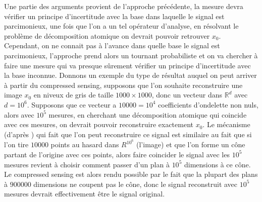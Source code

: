 Une partie des arguments provient de l'approche précédente, la mesure devra vérifier un principe d'incertitude avec la base dans laquelle le signal est parcimonieux, une fois que l'on a un tel opérateur d'analyse, en résolvant le problème de décomposition atomique on devrait pouvoir retrouver $x_0$.
Cependant, on ne connait pas à l'avance dans quelle base le signal est parcimonieux, l'approche prend alors un tournant probabiliste et on va chercher à faire une mesure qui va presque sûrement vérifier un principe d'incertitude avec la base inconnue.
\newline
Donnons un exemple du type de résultat auquel on peut arriver à partir du compressed sensing, supposons que l'on souhaite reconstruire une image $x_0$ en niveux de gris de taille $1000\times1000$, donc un vecteur dans $\mathbb{R}^d$ avec $d=10^6$. 
Supposons que ce vecteur a $10 000=10^4$ coefficients d'ondelette non nuls, alors avec $10^5$ mesures, en cherchant une décomposition atomique qui coincide avec ces mesures, on devrait pouvoir reconstruire exactement $x_0$.
Le mécanisme (d'après \cite{DonohoForMost}) qui fait que l'on peut reconstruire ce signal est similaire au fait que si l'on tire $10 000$ points au hasard dans $R^{10^6}$ (l'image) et que l'on forme un cône partant de l'origine avec ces points, alors faire coincider le signal avec les $10^5$ mesures revient à choisir comment passer d'un plan à $10^5$ dimensions à ce cône.
Le compressed sensing est alors rendu possible par le fait que la plupart des plans à $900 000$ dimensions ne coupent pas le cône, donc le signal reconstruit avec $10^5$ mesures devrait effectivement être le signal original.

